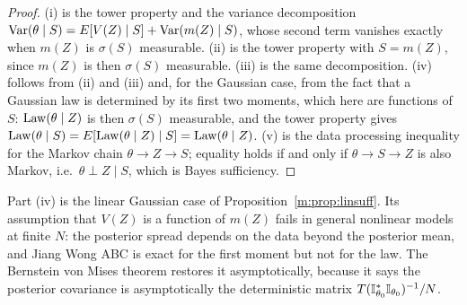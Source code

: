 \begin{proof}
(i) is the tower property and the variance decomposition $\mathrm{Var}(\theta\mid S)=E[V(Z)\mid S]+\mathrm{Var}(m(Z)\mid S)$, whose second term vanishes exactly when $m(Z)$ is $\sigma(S)$ measurable. (ii) is the tower property with $S=m(Z)$, since $m(Z)$ is then $\sigma(S)$ measurable. (iii) is the same decomposition. (iv) follows from (ii) and (iii) and, for the Gaussian case, from the fact that a Gaussian law is determined by its first two moments, which here are functions of $S$: $\operatorname{Law}(\theta\mid Z)$ is then $\sigma(S)$ measurable, and the tower property gives $\operatorname{Law}(\theta\mid S)=E[\operatorname{Law}(\theta\mid Z)\mid S]=\operatorname{Law}(\theta\mid Z)$. (v) is the data processing inequality for the Markov chain $\theta\to Z\to S$; equality holds if and only if $\theta\to S\to Z$ is also Markov, i.e.\ $\theta\perp Z\mid S$, which is Bayes sufficiency.
\end{proof}

Part (iv) is the linear Gaussian case of Proposition~\ref{m:prop:linsuff}. Its assumption that $V(Z)$ is a function of $m(Z)$ fails in general nonlinear models at finite $N$: the posterior spread depends on the data beyond the posterior mean, and Jiang Wong ABC is exact for the first moment but not for the law. The Bernstein von Mises theorem restores it asymptotically, because it says the posterior covariance is asymptotically the deterministic matrix $T(\mathbb{I}^*_{\theta_0}\mathbb{I}_{\theta_0})^{-1}/N$.

